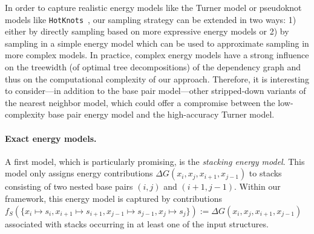 \documentclass[]{bmcart}
\newcommand{\val}{\bar S} %
\newcommand{\Def}[1]{\emph{#1}}
\newcommand{\evalfor}[2]{#1(#2)}
\newcommand{\citep}[1]{\cite{#1}}
\newcommand{\revised}[1]{{\color{red} #1}}
\begin{document}

In order to capture realistic energy models like the Turner model or pseudoknot models like {\tt HotKnots}~\citep{Ren2005}, our sampling strategy can be extended in two ways: 1) either by directly sampling based on more expressive energy models \revised{or 2) by sampling in a simple energy model which} can be used to approximate sampling in more complex models.  In practice, complex energy models \revised{have} a strong influence on the treewidth (of optimal tree decompositions) of the dependency graph and \revised{thus on} the computational complexity of our approach. Therefore, it is interesting to consider---in addition to the base pair model---other
stripped-down variants of the nearest neighbor model, which could offer a compromise between the low-complexity base pair energy model and the high-accuracy Turner model. 


\paragraph{Exact energy models.}
A first model, which is particularly promising, is the
\Def{stacking energy model}. This model only assigns energy
contributions $\Delta G(x_i,x_j,x_{i+1},x_{j-1})$ to stacks consisting of two nested base pairs $(i,j)$ and $(i+1,j-1)$. Within our framework, this energy model is captured by contributions $f_S(\{x_i\mapsto s_i, x_{i+1}\mapsto s_{i+1}, x_{j-1}\mapsto s_{j-1}, x_{j}\mapsto s_{j}\}):=\Delta G(x_i,x_j,x_{i+1},x_{j-1})$ associated with stacks occurring in at least one of the input structures.
\end{document}
